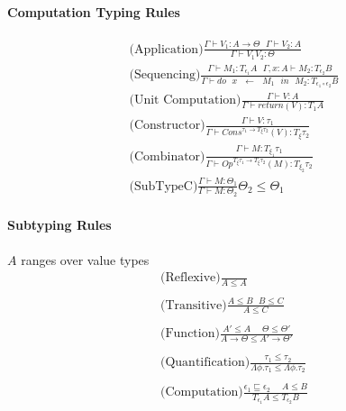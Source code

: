 \documentclass[twoside,a4paper,11pt]{article}
\newcommand{\s}{\mbox{ }}
\newcommand{\subtype}{\leq}
\newcommand{\subeffect}{\sqsubseteq}
\newcommand{\typeJudgement}[2]{\Gamma\vdash #1 \colon #2}
\newcommand{\modVarTypeJudgement}[3]{\Gamma, #1 \vdash #2 \colon #3}
\newcommand{\conditionalTypeRule}[4]{\typeRule{#1}{#2}{#3} #4}
\newcommand{\typeRule}[3]{\displaystyle\mbox{#1}\frac{#2}{#3}}
\begin{document}
\paragraph{Computation Typing Rules}

\[\begin{array}{c}
\typeRule{(Application)}{\typeJudgement{V_1}{A \rightarrow \Theta}\s\typeJudgement{V_2}{A}}{\typeJudgement{V_1 V_2}{\Theta}}
\\
\typeRule{(Sequencing)}{\typeJudgement{M_1}{T_{\epsilon_1} A}\s\modVarTypeJudgement{x: A}{M_2}{T_{\epsilon_2} B}}{\typeJudgement{do \s x \s \leftarrow \s M_1 \s in \s M_2}{T_{\epsilon_1 \circ \epsilon_2} B}}
\\
\typeRule{(Unit Computation)}{\typeJudgement{V}{A}}{\typeJudgement{return(V)}{T_{1}A}}
\\
\typeRule{(Constructor)}{\typeJudgement{V}{\tau_1}}{\typeJudgement{ Cons^{\tau_1 \rightarrow T_{\xi} \tau_2}(V)}{T_{\xi} \tau_2}}
\\
\typeRule{(Combinator)}{\typeJudgement{M}{{T_{\xi_1} \tau_1}}}{\typeJudgement{ Op^{T_{\xi} \tau_1 \rightarrow T_{\xi} \tau_2}(M)}{{T_{\xi_2} \tau_2}}}
\\
\conditionalTypeRule{(SubTypeC)}{\typeJudgement{M}{\Theta_1}}{\typeJudgement{M}{\Theta_2}}{\Theta_2 \subtype \Theta_1}
\end{array}\]

\paragraph{Subtyping Rules}

$A$ ranges over value types
\[\begin{array}{c}

\typeRule{(Reflexive)}{}{A \subtype A}
\\
\\
\typeRule{(Transitive)}{A \subtype B\s B\subtype C}{A \subtype C}
\\
\\
\typeRule{(Function)}{A' \subtype A \s\s \Theta\subtype \Theta'}{A \rightarrow \Theta \subtype A' \rightarrow \Theta'}
\\
\\
\typeRule{(Quantification)}{\tau_1 \subtype \tau_2}{\Lambda \phi. \tau_1 \subtype \Lambda \phi. \tau_2}
\\
\\
\typeRule{(Computation)}{\epsilon_1 \subeffect \epsilon_2\s\s A \subtype B}{T_{\epsilon_1} A \subtype T_{\epsilon_2} B}

\end{array}\]
\end{document}

